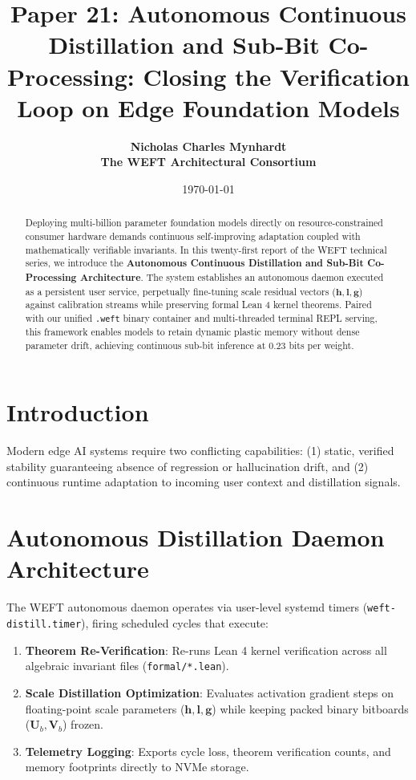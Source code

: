\documentclass[11pt,a4paper]{article}
\title{\textbf{Paper 21: Autonomous Continuous Distillation and Sub-Bit Co-Processing: Closing the Verification Loop on Edge Foundation Models}}
\author{
  \textbf{Nicholas Charles Mynhardt} \\
  \textbf{The WEFT Architectural Consortium}
}
\date{\today}
\begin{document}
\maketitle

\begin{abstract}
Deploying multi-billion parameter foundation models directly on resource-constrained consumer hardware demands continuous self-improving adaptation coupled with mathematically verifiable invariants. In this twenty-first report of the WEFT technical series, we introduce the \textbf{Autonomous Continuous Distillation and Sub-Bit Co-Processing Architecture}. The system establishes an autonomous daemon executed as a persistent user service, perpetually fine-tuning scale residual vectors ($\mathbf{h}, \mathbf{l}, \mathbf{g}$) against calibration streams while preserving formal Lean 4 kernel theorems. Paired with our unified \texttt{.weft} binary container and multi-threaded terminal REPL serving, this framework enables models to retain dynamic plastic memory without dense parameter drift, achieving continuous sub-bit inference at $0.23$ bits per weight.
\end{abstract}

\section{Introduction}
Modern edge AI systems require two conflicting capabilities: (1) static, verified stability guaranteeing absence of regression or hallucination drift, and (2) continuous runtime adaptation to incoming user context and distillation signals.

\section{Autonomous Distillation Daemon Architecture}
The WEFT autonomous daemon operates via user-level systemd timers (\texttt{weft-distill.timer}), firing scheduled cycles that execute:
\begin{enumerate}
    \item \textbf{Theorem Re-Verification}: Re-runs Lean 4 kernel verification across all algebraic invariant files (\texttt{formal/*.lean}).
    \item \textbf{Scale Distillation Optimization}: Evaluates activation gradient steps on floating-point scale parameters ($\mathbf{h}, \mathbf{l}, \mathbf{g}$) while keeping packed binary bitboards ($\mathbf{U}_b, \mathbf{V}_b$) frozen.
    \item \textbf{Telemetry Logging}: Exports cycle loss, theorem verification counts, and memory footprints directly to NVMe storage.
\end{enumerate}
\end{document}
